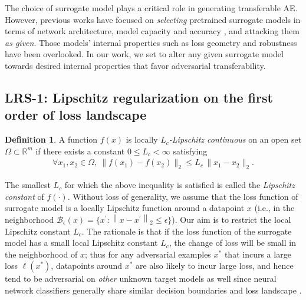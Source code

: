 \documentclass[letterpaper]{article} %
\theoremstyle{plain}
\theoremstyle{definition}
\newtheorem{definition}{Definition}
\newcommand{\fref}[1]{Fig.~\ref{#1}}
\newcommand{\red}[1]{\textcolor{red}{[#1]}}
\newcommand{\blue}[1]{\textcolor{blue}{[#1]}}
\begin{document}
The choice of surrogate model plays a critical role in generating transferable AE. However, previous works have focused on {\em selecting} pretrained surrogate models in terms of network architecture, model capacity and accuracy \cite{wu2020towards}, and
attacking them \emph{as given}. Those models' internal properties such as loss geometry and robustness have been overlooked. In our work, we set to alter any given surrogate model towards desired internal properties that favor adversarial transferability.

\subsection{LRS-1: Lipschitz regularization on the first order of loss landscape}

\begin{definition} \label{def:lip_continous}
A function $f(x)$ is locally \emph{$L_c$-Lipschitz continuous} on an open set $\Omega \subset \mathbb{R}^m$  if there exists a constant $0 \leq L_c<\infty$ satisfying
\begin{align*}
  \forall x_1, x_2 \in \Omega,\ \|f(x_1) - f(x_2)\|_2 \leq L_c\,\|x_1 - x_2\|_2.
\end{align*}

\end{definition}

The smallest $L_c$ for which the above inequality is satisfied is called the {\em Lipschitz constant} of $f(\cdot)$. Without loss of generality, we assume that the loss function of surrogate model is a locally Lipschitz function around a datapoint $x$ (i.e., in the neighborhood $\mathcal{B}_\epsilon(x)=\{ x^{\prime}:\left\|x-x^{\prime}\right\|_2 \leq \epsilon \}$). Our aim is to restrict the local Lipschitz constant $L_c$. The rationale is that if the loss function of the surrogate model has a small local Lipschitz constant $L_c$, the change of loss will be small in the neighborhood of $x$; thus for any adversarial examples $x^*$ that incurs a large loss $\ell(x^*)$, datapoints around $x^*$ are also likely to incur large loss, and hence tend to be adversarial on {\em other} unknown target models as well since neural network classifiers generally share similar decision boundaries and loss landscape \cite{liu2017delving}. %
\end{document}
